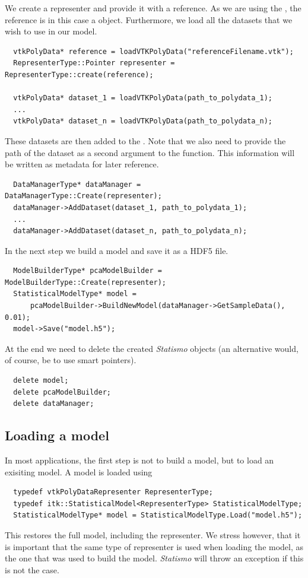 \documentclass{InsightArticle}
\newcommand{\Statismo}{\emph{Statismo}\xspace}
\begin{document}
We create a representer and provide it with a reference. As we are
using the , the reference is in this case
a  object.
Furthermore, we load all the datasets that we wish to use in our model.
\begin{verbatim}
  vtkPolyData* reference = loadVTKPolyData("referenceFilename.vtk");
  RepresenterType::Pointer representer = RepresenterType::create(reference);

  vtkPolyData* dataset_1 = loadVTKPolyData(path_to_polydata_1);
  ... 
  vtkPolyData* dataset_n = loadVTKPolyData(path_to_polydata_n);
\end{verbatim}

These datasets are then added to the . Note that we also need to provide the path of the dataset as
a second argument to the  function. This information will be written as metadata for later
reference. 

\begin{verbatim}
  DataManagerType* dataManager =  DataManagerType::Create(representer);
  dataManager->AddDataset(dataset_1, path_to_polydata_1);
  ...
  dataManager->AddDataset(dataset_n, path_to_polydata_n);
\end{verbatim}
In the next step we build a model and save it as a HDF5 file. 
\begin{verbatim}
  ModelBuilderType* pcaModelBuilder = ModelBuilderType::Create(representer);
  StatisticalModelType* model =  
      pcaModelBuilder->BuildNewModel(dataManager->GetSampleData(), 0.01);
  model->Save("model.h5");
\end{verbatim}
At the end we need to delete the created \Statismo objects (an alternative would, of course, be to use
smart pointers).
\begin{verbatim}
  delete model;
  delete pcaModelBuilder;
  delete dataManager;
\end{verbatim}

\subsection{Loading a model}
In most applications, the first step is not to build a model, but to load an exisiting model. 
A model is loaded using 
\begin{verbatim}
  typedef vtkPolyDataRepresenter RepresenterType;
  typedef itk::StatisticalModel<RepresenterType> StatisticalModelType;
  StatisticalModelType* model = StatisticalModelType.Load("model.h5");
\end{verbatim}
This restores the full model, including the representer. 
We stress however, that it is important that the same type of representer is used when loading the model, as the one that was used to build the model. 
\Statismo will throw an exception if this is not the case. 
\end{document}
